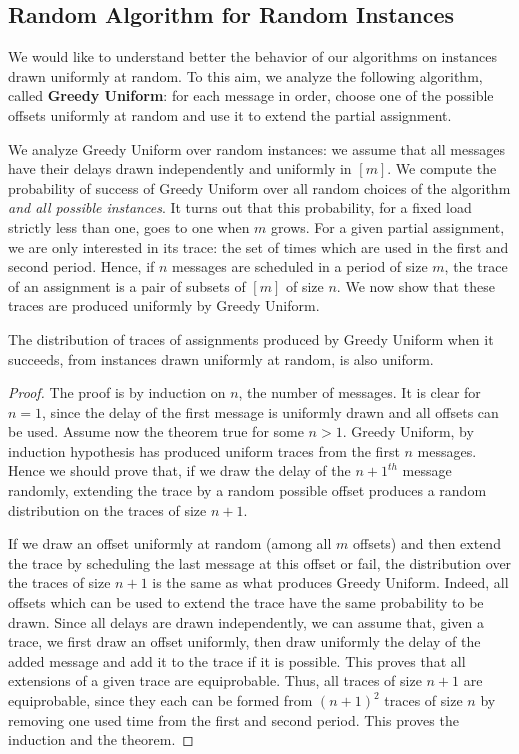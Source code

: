 \documentclass[a4paper,UKenglish,cleveref, autoref, thm-restate]{lipics-v2019}
\begin{document}
\subsection{Random Algorithm for Random Instances}

We would like to understand better the behavior of our algorithms
on instances drawn uniformly at random. To this aim, we analyze the following algorithm, called \textbf{Greedy Uniform}: for each message in order, choose one of the possible offsets uniformly at random and use it to extend the partial assignment. 

We analyze Greedy Uniform over random instances: we assume that all messages have 
their delays drawn independently and uniformly in $[m]$. We compute the probability of success of Greedy Uniform over all random choices of the algorithm \emph{and all possible instances}. 
It turns out that this probability, for a fixed load strictly less than one, goes to one when $m$ grows. 
For a given partial assignment, we are only interested in its trace: the set of times which are used in the first and second period. Hence, if $n$ messages are scheduled in a period of size $m$, the trace of an assignment is a pair of subsets of $[m]$ of size $n$. We now show that these traces are produced uniformly by Greedy Uniform.

\begin{theorem}
The distribution of traces of assignments produced by Greedy Uniform when it succeeds, from instances drawn uniformly at random, is also uniform.
\end{theorem}
\begin{proof}
The proof is by induction on $n$, the number of messages. It is clear for $n=1$,
since the delay of the first message is uniformly drawn and all offsets can be used.
Assume now the theorem true for some $n>1$. Greedy Uniform, by induction hypothesis has produced
uniform traces from the first $n$ messages.  Hence we should prove that, if we draw the delay
of the $n+1^{th}$ message randomly, extending the trace by a random possible offset produces a random distribution on the traces of size $n+1$. 

 If we draw an offset uniformly at random (among all $m$ offsets) and then extend the trace by scheduling the last message at this offset or fail, the distribution over the traces of size $n+1$ is the same as what produces Greedy Uniform. Indeed, all offsets which can be used to extend the trace have the same probability to be drawn. Since all delays are drawn independently, we can assume that, given a trace, we first draw an offset uniformly, then draw uniformly the delay of the added message and add it to the trace if it is possible. This proves that all extensions of a given trace are equiprobable. Thus, all traces of size $n+1$ are equiprobable, since they each can be formed from $(n+1)^2$ traces of size $n$ by removing one used time from the first and second period. This proves the induction and the theorem.
\end{proof}
\end{document}
